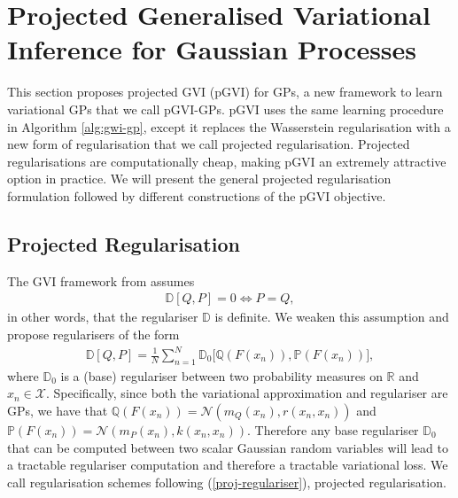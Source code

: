 \documentclass{article}
\numberwithin{equation}{section}
\begin{document}
\newpage
\section{Projected Generalised Variational Inference for Gaussian Processes}\label{section:pgvi}
This section proposes projected GVI (pGVI) for GPs, a new framework to learn variational GPs that we call pGVI-GPs.
pGVI uses the same learning procedure in Algorithm \ref{alg:gwi-gp}, except it replaces the Wasserstein regularisation with a new form of regularisation that we call projected regularisation.
Projected regularisations are computationally cheap, making pGVI an extremely attractive option in practice.
We will present the general projected regularisation formulation followed by different constructions of the pGVI objective.

\subsection{Projected Regularisation}
The GVI framework from \cite{knoblauch2022optimization} assumes
\begin{align}
    \mathbb{D}\left[Q, P\right] = 0 \Leftrightarrow P = Q,
\end{align}
in other words, that the regulariser $\mathbb{D}$ is definite.
We weaken this assumption and propose regularisers of the form
\begin{align}
    \mathbb{D}\left[Q, P\right] = \frac{1}{N}\sum_{{n}=1}^{N} \mathbb{D}_0 \Big[\mathbb{Q}\left(F(x_n)\right), \mathbb{P}\left(F(x_n)\right)\Big],
    \label{proj-regulariser}
\end{align}
where $\mathbb{D}_0$ is a (base) regulariser between two probability measures on $\mathbb{R}$ and $x_n \in \mathcal{X}$.
Specifically, since both the variational approximation and regulariser are GPs, we have that $\mathbb{Q}\left(F(x_n)\right) = \mathcal{N}\left(m_Q(x_n), r(x_n, x_n)\right)$ and $\mathbb{P}\left(F(x_n)\right) = \mathcal{N}\left(m_P(x_n), k(x_n, x_n)\right)$.
Therefore any base regulariser $\mathbb{D}_0$ that can be computed between two scalar Gaussian random variables will lead to a tractable regulariser computation and therefore a tractable variational loss. We call regularisation schemes following (\ref{proj-regulariser}), projected regularisation.
\end{document}
